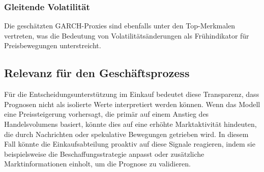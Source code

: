 \subsubsection{Gleitende Volatilität}
Die geschätzten GARCH-Proxies sind ebenfalls unter den Top-Merkmalen vertreten, was die Bedeutung von Volatilitätsänderungen als Frühindikator für Preisbewegungen unterstreicht.

\subsection{Relevanz für den Geschäftsprozess}
Für die Entscheidungsunterstützung im Einkauf bedeutet diese Transparenz, dass Prognosen nicht als isolierte Werte interpretiert werden können.
Wenn das Modell eine Preissteigerung vorhersagt, die primär auf einem Anstieg des Handelsvolumens basiert, könnte dies auf eine erhöhte Marktaktivität hindeuten, die durch Nachrichten oder spekulative Bewegungen getrieben wird.
In diesem Fall könnte die Einkaufsabteilung proaktiv auf diese Signale reagieren, indem sie beispielsweise die Beschaffungsstrategie anpasst oder zusätzliche Marktinformationen einholt, um die Prognose zu validieren.
